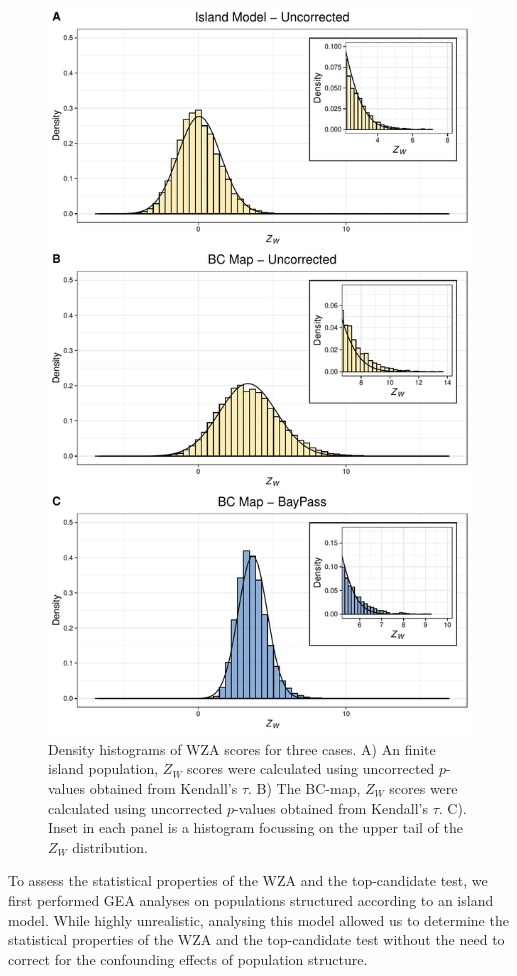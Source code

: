 \documentclass[11pt,twoside,lineno]{GSA_format}
\begin{document}
\begin{figure}[h]
  \includegraphics[width=0.6\linewidth,keepaspectratio]{Plots/neutralResults_histogram.pdf} 

  \caption{Density histograms of WZA scores for three cases. A) An finite island population, $Z_W$ scores were calculated using uncorrected $p$-values obtained from Kendall's $\tau$. B)  The BC-map, $Z_W$ scores were calculated using uncorrected $p$-values obtained from Kendall's $\tau$. C). Inset in each panel is a histogram focussing on the upper tail of the $Z_W$ distribution.}
  
  \label{fig:NeutralHistograms}
\end{figure}

To assess the statistical properties of the WZA and the top-candidate test, we first performed GEA analyses on populations structured according to an island model. While highly unrealistic, analysing this model allowed us to determine the statistical properties of the WZA and the top-candidate test without the need to correct for the confounding effects of population structure. 
\end{document}
